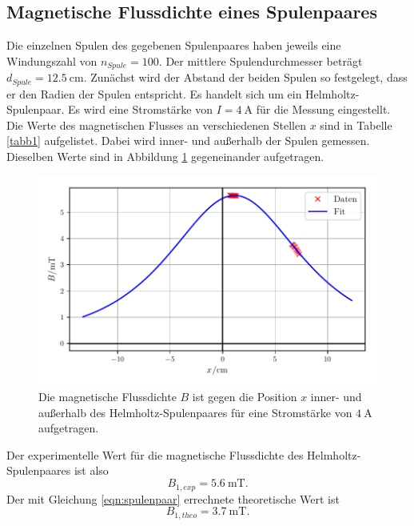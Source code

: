 \subsection{Magnetische Flussdichte eines Spulenpaares}
Die einzelnen Spulen des gegebenen Spulenpaares haben jeweils
eine Windungszahl von $n_{Spule} = \num{100}$. Der mittlere
Spulendurchmesser beträgt $d_{Spule} = \SI{12.5}{\centi\meter}$.
\newline
Zunächst wird der Abstand der beiden Spulen so festgelegt, dass
er den Radien der Spulen entspricht. Es handelt sich um ein
Helmholtz-Spulenpaar.
Es wird eine Stromstärke von $I = \SI{4}{\ampere}$ für die
Messung eingestellt.
Die Werte des magnetischen Flusses an verschiedenen Stellen
$x$ sind in Tabelle \ref{tabb1} aufgelistet. Dabei wird inner-
und außerhalb der Spulen gemessen.
Dieselben Werte sind in Abbildung \ref{plotb1} gegeneinander
aufgetragen.


\begin{figure}
    \centering
    \includegraphics{build/plotb1.pdf}
    \caption{Die magnetische Flussdichte $B$ ist gegen die Position $x$ inner-
    und außerhalb des Helmholtz-Spulenpaares für eine Stromstärke von
    $\SI{4}{\ampere}$ aufgetragen.}
    \label{plotb1}
\end{figure}

\noindent Der experimentelle Wert für die magnetische Flussdichte
des Helmholtz-Spulenpaares ist also
\begin{equation*}
   B_{1,exp} = \SI{5.6}{\milli\tesla}.
\end{equation*}
Der mit Gleichung \eqref{eqn:spulenpaar} errechnete theoretische
Wert ist 
\begin{equation*}
   B_{1,theo} = \SI{3.7}{\milli\tesla}.
\end{equation*}

